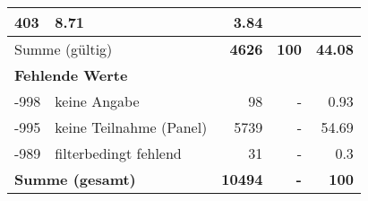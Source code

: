 \begin{longtable}{lXrrr}
       \num{403} &
       \num[round-mode=places,round-precision=2]{8.71} &
         \num[round-mode=places,round-precision=2]{3.84} \\
     \midrule
     \multicolumn{2}{l}{Summe (gültig)} &
       \textbf{\num{4626}} &
     \textbf{\num{100}} &
       \textbf{\num[round-mode=places,round-precision=2]{44.08}} \\
     \multicolumn{5}{l}{\textbf{Fehlende Werte}}\\
       -998 &
       keine Angabe &
         \num{98} &
        - &
         \num[round-mode=places,round-precision=2]{0.93} \\
       -995 &
       keine Teilnahme (Panel) &
         \num{5739} &
        - &
         \num[round-mode=places,round-precision=2]{54.69} \\
       -989 &
       filterbedingt fehlend &
         \num{31} &
        - &
         \num[round-mode=places,round-precision=2]{0.3} \\
     \midrule
     \multicolumn{2}{l}{\textbf{Summe (gesamt)}} &
          \textbf{\num{10494}} &
        \textbf{-} &
        \textbf{\num{100}} \\
     \bottomrule
     \end{longtable}
     
